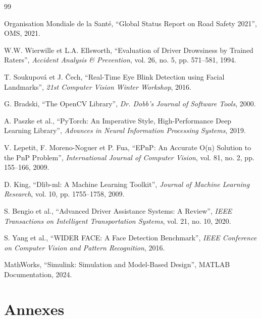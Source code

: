 \documentclass[12pt,a4paper]{report}
\begin{document}
\begin{thebibliography}{99}

Organisation Mondiale de la Santé, ``Global Status Report on Road Safety 2021'', OMS, 2021.

W.W. Wierwille et L.A. Ellsworth, ``Evaluation of Driver Drowsiness by Trained Raters'', \textit{Accident Analysis \& Prevention}, vol. 26, no. 5, pp. 571--581, 1994.

T. Soukupová et J. Čech, ``Real-Time Eye Blink Detection using Facial Landmarks'', \textit{21st Computer Vision Winter Workshop}, 2016.

G. Bradski, ``The OpenCV Library'', \textit{Dr. Dobb's Journal of Software Tools}, 2000.

A. Paszke et al., ``PyTorch: An Imperative Style, High-Performance Deep Learning Library'', \textit{Advances in Neural Information Processing Systems}, 2019.

V. Lepetit, F. Moreno-Noguer et P. Fua, ``EPnP: An Accurate O(n) Solution to the PnP Problem'', \textit{International Journal of Computer Vision}, vol. 81, no. 2, pp. 155--166, 2009.

D. King, ``Dlib-ml: A Machine Learning Toolkit'', \textit{Journal of Machine Learning Research}, vol. 10, pp. 1755--1758, 2009.

S. Bengio et al., ``Advanced Driver Assistance Systems: A Review'', \textit{IEEE Transactions on Intelligent Transportation Systems}, vol. 21, no. 10, 2020.

S. Yang et al., ``WIDER FACE: A Face Detection Benchmark'', \textit{IEEE Conference on Computer Vision and Pattern Recognition}, 2016.

MathWorks, ``Simulink: Simulation and Model-Based Design'', MATLAB Documentation, 2024.

\end{thebibliography}

\appendix
\chapter{Annexes}
\end{document}
